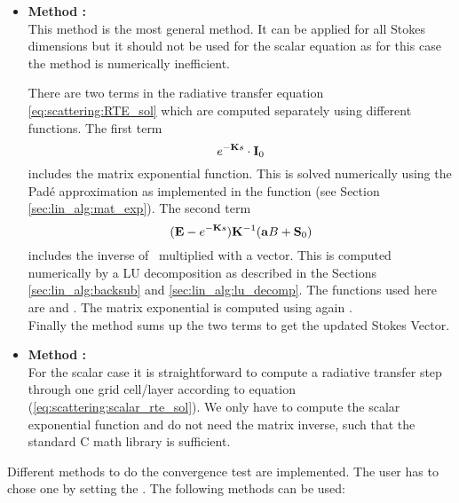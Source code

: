 \begin{itemize}
\item {\bf Method :}\\
This method is the most general method. It can be applied for all
Stokes dimensions but it should not be used for the scalar equation as
for this case the method is numerically inefficient. 

There are two terms in the radiative transfer equation
\ref{eq:scattering:RTE_sol} which are
computed separately using different functions. The first term 
\begin{equation}
 e^{-{\bf K} s}\cdot{\bf I}_0
\end{equation}
includes the matrix exponential function. This is solved numerically
using the Pad\'e approximation as implemented in the function 
 (see Section \ref{sec:lin_alg:mat_exp}).
The second term 
\begin{equation}
({\bf E} - e^{-{\bf K}
    s}) {\bf K}^{-1} ({\bf a} B + {\bf S}_0)
\end{equation}
includes the inverse of \ExtMat\ multiplied with a vector. This is
computed numerically by a LU decomposition as described in the
Sections \ref{sec:lin_alg:backsub} and
\ref{sec:lin_alg:lu_decomp}. The functions used here are
 and . The matrix exponential is
computed using again .\\
Finally the method sums up the two terms to get the updated Stokes Vector. 
 
\item {\bf Method :}\\
For the scalar case it is straightforward to compute a radiative
transfer step through one grid cell/layer according to equation
(\ref{eq:scattering:scalar_rte_sol}). We only
have to compute the scalar exponential function and do not need the
matrix inverse, such that the standard C math library is sufficient.
\end{itemize}


\label{sec:scattering:conv_method}

Different methods to do the convergence test are implemented. The user
has to chose one by setting the
. The following methods can be
used:

